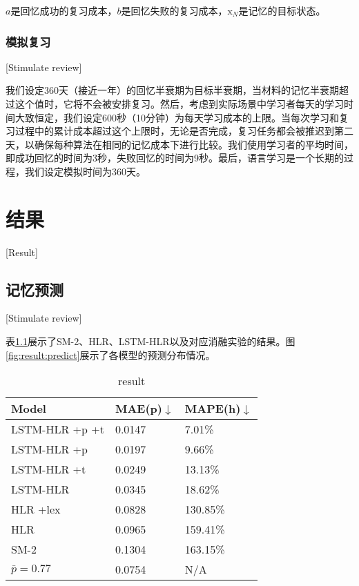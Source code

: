 $a$是回忆成功的复习成本，$b$是回忆失败的复习成本，$\bm{\mathrm{x}}_{N}$是记忆的目标状态。

\subsection{模拟复习}[Stimulate review]

我们设定360天（接近一年）的回忆半衰期为目标半衰期，当材料的记忆半衰期超过这个值时，它将不会被安排复习。然后，考虑到实际场景中学习者每天的学习时间大致恒定，我们设定600秒（10分钟）为每天学习成本的上限。当每次学习和复习过程中的累计成本超过这个上限时，无论是否完成，复习任务都会被推迟到第二天，以确保每种算法在相同的记忆成本下进行比较。我们使用学习者的平均时间，即成功回忆的时间为3秒，失败回忆的时间为9秒。最后，语言学习是一个长期的过程，我们设定模拟时间为360天。

\chapter{结果}[Result]

\section{记忆预测}[Stimulate review]

表\ref{tab:result:predict}展示了SM-2、HLR、LSTM-HLR以及对应消融实验的结果。图\ref{fig:result:predict}展示了各模型的预测分布情况。

\begin{table}[htbp]
    \caption{result}
    \label{tab:result:predict}
    \vspace{0.5em}\centering\wuhao
    \begin{tabular}{lll}
    \toprule[1.5pt]
    \textbf{Model}  &\textbf{MAE(p)}$\downarrow$ &\textbf{MAPE(h)}$\downarrow$\\
    \midrule[1pt]
    LSTM-HLR +p +t  &0.0147   &7.01\%    \\
    LSTM-HLR +p     &0.0197   &9.66\%    \\
    LSTM-HLR +t     &0.0249   &13.13\%    \\
    LSTM-HLR        &0.0345   &18.62\%    \\
    \midrule[1pt]
    HLR +lex        &0.0828   &130.85\%    \\
    HLR             &0.0965   &159.41\%   \\
    \midrule[1pt]
    SM-2            &0.1304   &163.15\%    \\
    \midrule[1pt]
    $\bar{p}=0.77$  &0.0754   &N/A        \\
    \bottomrule[1.5pt]
    \end{tabular}
\end{table}

